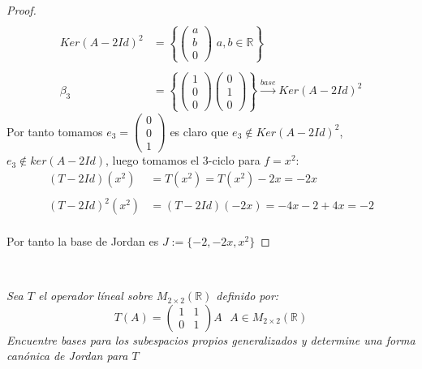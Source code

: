 \documentclass[11pt]{article}
\newcommand{\R}{\mathbb{R}}
\begin{document}
\begin{proof}
\begin{align*}
        \,\\
        Ker(A-2Id)^2&=\left\{\begin{pmatrix}
            a\\
            b\\
            0
        \end{pmatrix}\,\,a,b\in \R\right\}\,\\
        \,\\
        \beta_3&=\left\{\begin{pmatrix}
        1\\
        0\\
        0
        \end{pmatrix}\begin{pmatrix}
        0\\
        1\\
        0
        \end{pmatrix}\right\}\xrightarrow{base}Ker(A-2Id)^2
    \end{align*}
    Por tanto tomamos $e_3=\begin{pmatrix}
        0\\
        0\\
        1
    \end{pmatrix}$ es claro que $e_3\notin Ker(A-2Id)^2$,$e_3\notin ker(A-2Id)$, luego tomamos el $3$-ciclo para $f=x^2$:\,\\
    \begin{align*}
        (T-2Id)(x^2)&=T(x^2)=T(x^2)-2x=-2x\\
        \,\\
        (T-2Id)^2(x^2)&=(T-2Id)(-2x)=-4x-2+4x=-2
    \end{align*}\,\\
    Por tanto la base de Jordan es $J:=\{-2,-2x,x^2\}$
\end{proof}\,\\
\begin{tcolorbox}[title = \textcolor{black}{\textcolor{white}{Problema 2}}]
\textit{Sea $T$ el operador l\'ineal sobre $M_{2\times 2}(\R)$ definido por:\,\\
\begin{equation*}
    T(A)=\begin{pmatrix}
        1&1\\
        0&1
    \end{pmatrix}A\,\,\,\,A\in M_{2\times 2}(\R)
\end{equation*}
Encuentre bases para los subespacios propios generalizados y determine una forma can\'onica de Jordan para $T$
}
\end{tcolorbox}
\end{document}
